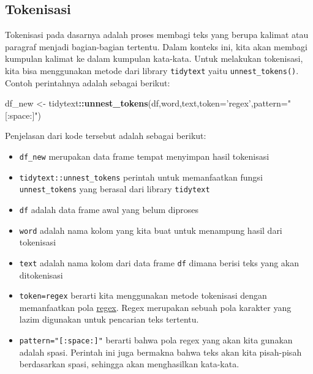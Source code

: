 \documentclass[]{book}
\newenvironment{Shaded}{\begin{snugshade}}{\end{snugshade}}
\newcommand{\DataTypeTok}[1]{\textcolor[rgb]{0.13,0.29,0.53}{#1}}
\newcommand{\KeywordTok}[1]{\textcolor[rgb]{0.13,0.29,0.53}{\textbf{#1}}}
\newcommand{\NormalTok}[1]{#1}
\newcommand{\OperatorTok}[1]{\textcolor[rgb]{0.81,0.36,0.00}{\textbf{#1}}}
\newcommand{\StringTok}[1]{\textcolor[rgb]{0.31,0.60,0.02}{#1}}
\providecommand{\tightlist}{%
  \setlength{\itemsep}{0pt}\setlength{\parskip}{0pt}}
\begin{document}
\hypertarget{tokenisasi}{%
\subsection{Tokenisasi}\label{tokenisasi}}

Tokenisasi pada dasarnya adalah proses membagi teks yang berupa kalimat
atau paragraf menjadi bagian-bagian tertentu. Dalam konteks ini, kita
akan membagi kumpulan kalimat ke dalam kumpulan kata-kata. Untuk
melakukan tokenisasi, kita bisa menggunakan metode dari library
\texttt{tidytext} yaitu \texttt{unnest\_tokens()}. Contoh perintahnya
adalah sebagai berikut:

\begin{Shaded}
\begin{Highlighting}[]
\NormalTok{df_new <-}\StringTok{ }\NormalTok{tidytext}\OperatorTok{::}\KeywordTok{unnest_tokens}\NormalTok{(df,word,text,}\DataTypeTok{token=}\StringTok{'regex'}\NormalTok{,}\DataTypeTok{pattern=}\StringTok{"[:space:]"}\NormalTok{)}
\end{Highlighting}
\end{Shaded}

Penjelasan dari kode tersebut adalah sebagai berikut:

\begin{itemize}
\tightlist
\item
  \texttt{df\_new} merupakan data frame tempat menyimpan hasil
  tokenisasi
\item
  \texttt{tidytext::unnest\_tokens} perintah untuk memanfaatkan fungsi
  \texttt{unnest\_tokens} yang berasal dari library \texttt{tidytext}
\item
  \texttt{df} adalah data frame awal yang belum diproses
\item
  \texttt{word} adalah nama kolom yang kita buat untuk menampung hasil
  dari tokenisasi
\item
  \texttt{text} adalah nama kolom dari data frame \texttt{df} dimana
  berisi teks yang akan ditokenisasi
\item
  \texttt{token=\textquotesingle{}regex\textquotesingle{}} berarti kita
  menggunakan metode tokenisasi dengan memanfaatkan pola
  \href{https://en.wikipedia.org/wiki/Regular_expression}{regex}. Regex
  merupakan sebuah pola karakter yang lazim digunakan untuk pencarian
  teks tertentu.
\item
  \texttt{pattern="{[}:space:{]}"} berarti bahwa pola regex yang akan
  kita gunakan adalah spasi. Perintah ini juga bermakna bahwa teks akan
  kita pisah-pisah berdasarkan spasi, sehingga akan menghasilkan
  kata-kata.
\end{itemize}
\end{document}
